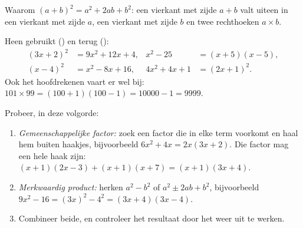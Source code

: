 \begin{omfigure}

{\small Waarom $(a+b)^2 = a^2 + 2ab + b^2$: een vierkant met zijde $a + b$
valt uiteen in een vierkant met zijde $a$, een vierkant met zijde $b$ en twee
rechthoeken $a \times b$.}
\end{omfigure}

\begin{example}\label{ex:g10:algebra:identities}
Heen gebruikt () en terug ():
\begin{align*}
(3x + 2)^2 &= 9x^2 + 12x + 4,
& x^2 - 25 &= (x+5)(x-5), \\
(x - 4)^2 &= x^2 - 8x + 16,
& 4x^2 + 4x + 1 &= (2x + 1)^2 .
\end{align*}
Ook het hoofdrekenen vaart er wel bij: $101 \times 99 = (100+1)(100-1) =
10000 - 1 = 9999$.
\end{example}

\begin{method}\label{met:g10:algebra:factor}
Probeer, in deze volgorde:
\begin{enumerate}
  \item \emph{Gemeenschappelijke factor:} zoek een factor die in elke term
        voorkomt en haal hem buiten haakjes, bijvoorbeeld
        $6x^2 + 4x = 2x(3x + 2)$. Die factor mag een hele haak zijn:
        $(x+1)(2x-3) + (x+1)(x+7) = (x+1)(3x+4)$.
  \item \emph{Merkwaardig product:} herken $a^2 - b^2$ of
        $a^2 \pm 2ab + b^2$, bijvoorbeeld $9x^2 - 16 = (3x)^2 - 4^2 =
        (3x+4)(3x-4)$.
  \item Combineer beide, en controleer het resultaat door het weer uit te
        werken.
\end{enumerate}
\end{method}

